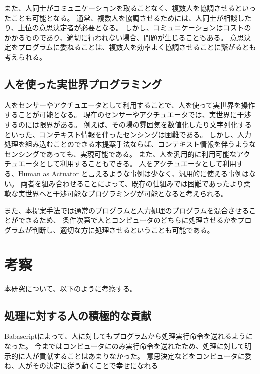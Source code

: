 \documentclass[twoside]{wiss}
\begin{document}
また、人同士がコミュニケーションを取ることなく、複数人を協調させるといったことも可能となる。
通常、複数人を協調させるためには、人同士が相談したり、上位の意思決定者が必要となる。
しかし、コミュニケーションはコストのかかるものであり、適切に行われない場合、問題が生じることもある。
意思決定をプログラムに委ねることは、複数人を効率よく協調させることに繋がるとも考えられる。


\subsection{人を使った実世界プログラミング}

人をセンサーやアクチュエータとして利用することで、人を使って実世界を操作することが可能となる。
現在のセンサーやアクチュエータでは、実世界に干渉するのには限界がある。
例えば、その場の雰囲気を数値化したり文字列化するといった、コンテキスト情報を伴ったセンシングは困難である。
しかし、人力処理を組み込むことのできる本提案手法ならば、コンテキスト情報を伴うようなセンシングであっても、実現可能である。
また、人を汎用的に利用可能なアクチュエータとして利用することもできる。
人をアクチュエータとして利用する、Human as Actuator と言えるような事例は少なく、汎用的に使える事例はない。
両者を組み合わせることによって、既存の仕組みでは困難であったより柔軟な実世界へと干渉可能なプログラミングが可能となると考えられる。

また、本提案手法では通常のプログラムと人力処理のプログラムを混合させることができるため、
条件次第で人とコンピュータのどちらに処理させるかをプログラムが判断し、適切な方に処理させるということも可能である。


\section{考察}

本研究について、以下のように考察する。

\subsection{処理に対する人の積極的な貢献}
Babascriptによって、人に対してもプログラムから処理実行命令を送れるようになった。
今まではコンピュータにのみ実行命令を送れたため、処理に対して明示的に人が貢献することはあまりなかった。
意思決定などをコンピュータに委ね、人がその決定に従う動くことで幸せになれる
\end{document}

